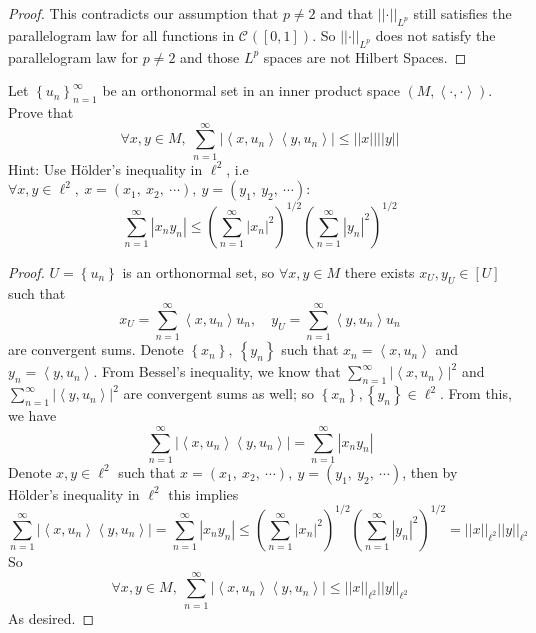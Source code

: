 \documentclass{article}
\newcommand{\norm}[1]{\left|\left|#1\right|\right|}
\newcommand{\abs}[1]{\left|#1\right|}
\newcommand{\parens}[1]{\left(#1\right)}
\newcommand{\bracks}[1]{\left\{#1\right\}}
\newcommand{\sqbracks}[1]{\left[#1\right]}
\newcommand{\abracks}[1]{\left< #1\right>}
\newcommand{\cont}[3]{\mathcal{C}_{#1}^{#2}\parens{#3}}
\begin{document}
\begin{proof}
    This contradicts our assumption that $p \neq 2$ and that $\norm{\cdot}_{L^p}$ still 
    satisfies the parallelogram law for all functions in $\cont{}{}{[0,1]}$.
    So $\norm{\cdot}_{L^p}$ does not satisfy the parallelogram law for $p \neq 2$ and 
    those $L^p$ spaces are not Hilbert Spaces.
    \end{proof}

    \item Let $\bracks{u_n}_{n=1}^\infty$ be an orthonormal set in an inner product space 
    $\parens{M, \abracks{\cdot, \cdot}}$. Prove that 
    $$\forall x,y \in M,\ \sum_{n=1}^\infty \abs{\abracks{x,u_n}\abracks{y, u_n}} 
    \leq \norm{x}\norm{y}$$
    Hint: Use H{\"o}lder's inequality in $\ell^2$, i.e $\forall x, y \in \ell^2,\ x = 
    \parens{x_1,\ x_2,\ \cdots },\ y = \parens{y_1,\ y_2,\ \cdots }$:
    $$\sum_{n=1}^\infty \abs{x_ny_n} \leq \parens{\sum_{n=1}^\infty \abs{x_n}^2}^{1/2}
    \parens{\sum_{n=1}^\infty \abs{y_n}^2}^{1/2}$$
    \begin{proof}
    $U = \bracks{u_n}$ is an orthonormal set, so $\forall x, y \in M$ there exists 
    $x_U, y_U \in \sqbracks{U}$ such that
    $$x_U = \sum_{n=1}^\infty \abracks{x,u_n}u_n,\quad y_U = \sum_{n=1}^\infty 
    \abracks{y, u_n}u_n$$
    are convergent sums.
    Denote $\bracks{x_n},\ \bracks{y_n}$ such that $x_n = \abracks{x, u_n}$ and 
    $y_n = \abracks{y, u_n}$. From Bessel's inequality, we know that $\sum_{n=1}^\infty
    \abs{\abracks{x,u_n}}^2$ and $\sum_{n=1}^\infty \abs{\abracks{y,u_n}}^2$ are convergent sums 
    as well; so $\bracks{x_n}, \bracks{y_n} \in \ell^2$.
    From this, we have 
    $$\sum_{n=1}^\infty \abs{\abracks{x,u_n}\abracks{y, u_n}} = \sum_{n=1}^\infty\abs{x_ny_n}$$
    Denote $x, y \in \ell^2$ such that $x = (x_1,\ x_2,\ \cdots),\ y = (y_1,\ y_2,\ \cdots)$, 
    then by H{\"o}lder's inequality in $\ell^2$ this implies 
    $$\sum_{n=1}^\infty \abs{\abracks{x,u_n}\abracks{y, u_n}} = \sum_{n=1}^\infty\abs{x_ny_n}
    \leq \parens{\sum_{n=1}^\infty\abs{x_n}^2}^{1/2}\parens{\sum_{n=1}^\infty\abs{y_n}^2}^{1/2} 
    = \norm{x}_{\ell^2}\norm{y}_{\ell^2}$$
    So 
    $$\forall x,y \in M,\ \sum_{n=1}^\infty \abs{\abracks{x,u_n}\abracks{y, u_n}} 
    \leq \norm{x}_{\ell^2}\norm{y}_{\ell^2}$$
    As desired.
    \end{proof}
    \pagebreak
    
\end{document}
